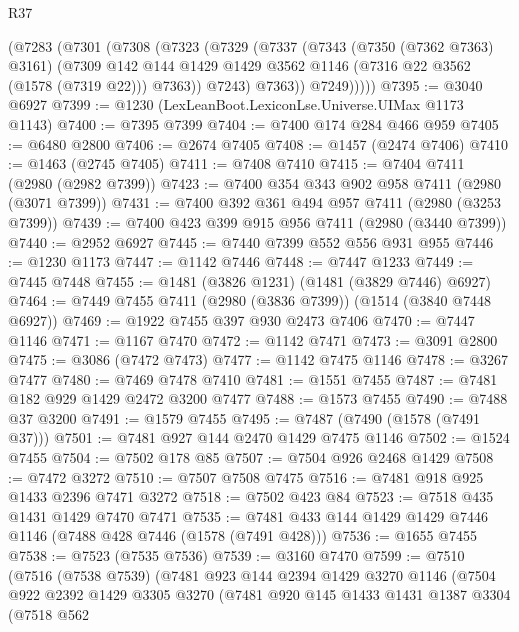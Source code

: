 \begin{lexlean}{R37}
\begin{coremodule}
        (@7283
          (@7301
            (@7308
              (@7323
                (@7329
                  (@7337
                    (@7343
                      (@7350 (@7362 @7363) @3161)
                      (@7309
                        @142
                        @144
                        @1429
                        @1429
                        @3562
                        @1146
                        (@7316 @22 @3562 (@1578 (@7319 @22)))
                        @7363))
                    @7243)
                  @7363))
              @7249)))))
@7395 := @3040 @6927
@7399 := @1230 (LexLeanBoot.LexiconLse.Universe.UIMax @1173 @1143)
@7400 := @7395 @7399
@7404 := @7400 @174 @284 @466 @959
@7405 := @6480 @2800
@7406 := @2674 @7405
@7408 := @1457 (@2474 @7406)
@7410 := @1463 (@2745 @7405)
@7411 := @7408 @7410
@7415 := @7404 @7411 (@2980 (@2982 @7399))
@7423 := @7400 @354 @343 @902 @958 @7411 (@2980 (@3071 @7399))
@7431 := @7400 @392 @361 @494 @957 @7411 (@2980 (@3253 @7399))
@7439 := @7400 @423 @399 @915 @956 @7411 (@2980 (@3440 @7399))
@7440 := @2952 @6927
@7445 := @7440 @7399 @552 @556 @931 @955
@7446 := @1230 @1173
@7447 := @1142 @7446
@7448 := @7447 @1233
@7449 := @7445 @7448
@7455 := @1481 (@3826 @1231) (@1481 (@3829 @7446) @6927)
@7464 := @7449 @7455 @7411 (@2980 (@3836 @7399)) (@1514 (@3840 @7448 @6927))
@7469 := @1922 @7455 @397 @930 @2473 @7406
@7470 := @7447 @1146
@7471 := @1167 @7470
@7472 := @1142 @7471
@7473 := @3091 @2800
@7475 := @3086 (@7472 @7473)
@7477 := @1142 @7475 @1146
@7478 := @3267 @7477
@7480 := @7469 @7478 @7410
@7481 := @1551 @7455
@7487 := @7481 @182 @929 @1429 @2472 @3200 @7477
@7488 := @1573 @7455
@7490 := @7488 @37 @3200
@7491 := @1579 @7455
@7495 := @7487 (@7490 (@1578 (@7491 @37)))
@7501 := @7481 @927 @144 @2470 @1429 @7475 @1146
@7502 := @1524 @7455
@7504 := @7502 @178 @85
@7507 := @7504 @926 @2468 @1429
@7508 := @7472 @3272
@7510 := @7507 @7508 @7475
@7516 := @7481 @918 @925 @1433 @2396 @7471 @3272
@7518 := @7502 @423 @84
@7523 := @7518 @435 @1431 @1429 @7470 @7471
@7535 := @7481 @433 @144 @1429 @1429 @7446 @1146 (@7488 @428 @7446 (@1578 (@7491 @428)))
@7536 := @1655 @7455
@7538 := @7523 (@7535 @7536)
@7539 := @3160 @7470
@7599 := @7510
    (@7516
      (@7538 @7539)
      (@7481
        @923
        @144
        @2394
        @1429
        @3270
        @1146
        (@7504
          @922
          @2392
          @1429
          @3305
          @3270
          (@7481
            @920
            @145
            @1433
            @1431
            @1387
            @3304
            (@7518
              @562

\end{coremodule}
\end{lexlean}
